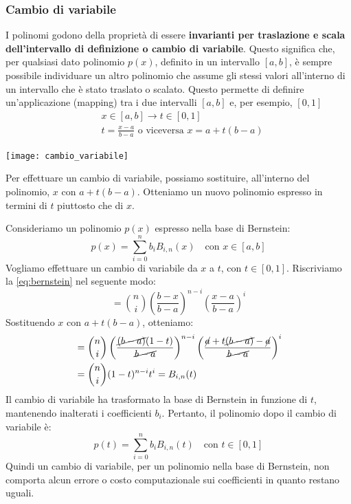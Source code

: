 \documentclass{article}
\begin{document}
\subsubsection{Cambio di variabile}
I polinomi godono della proprietà di essere \textbf{invarianti per traslazione e scala
dell'intervallo di definizione o cambio di variabile}. Questo significa che,
per qualsiasi dato polinomio $p(x)$, definito in un intervallo $[a,b]$, è
sempre possibile individuare un altro polinomio che assume gli stessi valori
all'interno di un intervallo che è stato traslato o scalato. Questo permette
di definire un'applicazione (mapping) tra i due intervalli $[a,b]$ e, per
esempio, $[0,1]$
\begin{equation} \label{eq:cambio_variabile}
   \begin{aligned}
       & x\in[a,b]\rightarrow t\in[0,1] \\ 
       & t=\frac{x-a}{b-a} \text{ o viceversa }x=a+t(b-a)
   \end{aligned} 
\end{equation}
\begin{center}
    \texttt{[image: cambio\_variabile]}
\end{center}
Per effettuare un cambio di variabile, possiamo sostituire, all'interno del
polinomio, $x$ con $a+t(b-a)$. Otteniamo un nuovo polinomio espresso in
termini di $t$ piuttosto che di $x$. 

Consideriamo un polinomio $p(x)$ espresso nella base di Bernstein:
$$p(x)=\displaystyle\sum_{i=0}^{n}b_iB_{i,n}(x)\quad \text{con }x\in[a,b]$$
Vogliamo effettuare un cambio di variabile da $x$ a $t$, con $t\in[0,1]$.
Riscriviamo la \ref{eq:bernstein} nel seguente modo:
$$=\binom{n}{i}\left(\frac{b-x}{b-a}\right)^{n-i}\left(\frac{x-a}{b-a}\right)^i$$
Sostituendo $x$ con $a+t(b-a)$, otteniamo:
\begin{equation*}
   \begin{aligned}
       &=\binom{n}{i}\left(\frac{\cancel{(b-a)}(1-t)}{\cancel{b-a}}\right)^{n-i}\left(
       \frac{\cancel{a}+t\cancel{(b-a)}-\cancel{a}}{\cancel{b-a}}\right)^i\\ 
       &=\binom{n}{i}(1-t)^{n-i}t^i=B_{i,n}(t)
   \end{aligned} 
\end{equation*}
Il cambio di variabile ha trasformato la base di Bernstein in funzione di $t$,
mantenendo inalterati i coefficienti $b_i$. Pertanto, il polinomio dopo il
cambio di variabile è:
$$p(t)=\displaystyle\sum_{i=0}^{n}b_iB_{i,n}(t)\quad \text{con }t\in[0,1]$$
Quindi un cambio di variabile, per un polinomio nella base di Bernstein, non
comporta alcun errore o costo computazionale sui coefficienti in quanto
restano uguali.
\end{document}
